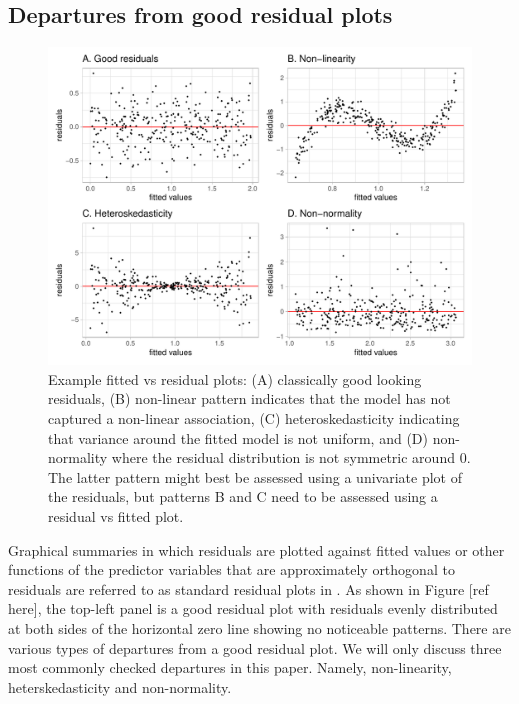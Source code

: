 \documentclass[]{interact}
\theoremstyle{plain}%
\theoremstyle{definition}
\theoremstyle{remark}
\begin{document}
\hypertarget{departures-from-good-residual-plots}{%
\subsection{Departures from good residual
plots}\label{departures-from-good-residual-plots}}

\begin{figure}
\includegraphics[width=1\linewidth]{paper_comparison_files/figure-latex/commondepartures-1} \caption{Example fitted vs residual plots: (A) classically good looking residuals, (B) non-linear pattern indicates that the model has not captured a non-linear association, (C) heteroskedasticity indicating that variance around the fitted model is not uniform, and (D) non-normality where the residual distribution is not symmetric around 0. The latter pattern might best be assessed using a univariate plot of the residuals, but patterns B and C need to be assessed using a residual vs fitted plot.}\label{fig:commondepartures}
\end{figure}

Graphical summaries in which residuals are plotted against fitted values
or other functions of the predictor variables that are approximately
orthogonal to residuals are referred to as standard residual plots in
\citet{cook1982residuals}. As shown in Figure {[}ref here{]}, the
top-left panel is a good residual plot with residuals evenly distributed
at both sides of the horizontal zero line showing no noticeable
patterns. There are various types of departures from a good residual
plot. We will only discuss three most commonly checked departures in
this paper. Namely, non-linearity, heterskedasticity and non-normality.
\end{document}
